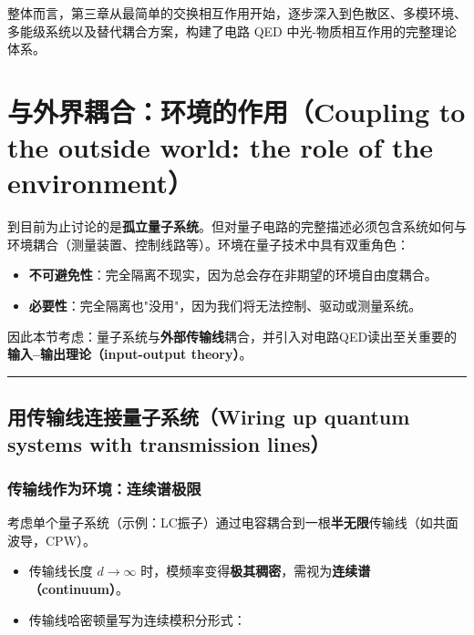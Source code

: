 \documentclass[12pt,a4paper,oneside]{ctexbook}
\begin{document}
整体而言，第三章从最简单的交换相互作用开始，逐步深入到色散区、多模环境、多能级系统以及替代耦合方案，构建了电路
QED 中光-物质相互作用的完整理论体系。


\section{与外界耦合：环境的作用（Coupling to the outside world: the role of the environment）}

到目前为止讨论的是\textbf{孤立量子系统}。但对量子电路的完整描述必须包含系统如何与环境耦合（测量装置、控制线路等）。环境在量子技术中具有双重角色：
\begin{itemize}
  \item \textbf{不可避免性}：完全隔离不现实，因为总会存在非期望的环境自由度耦合。
  \item \textbf{必要性}：完全隔离也"没用"，因为我们将无法控制、驱动或测量系统。
\end{itemize}

因此本节考虑：量子系统与\textbf{外部传输线}耦合，并引入对电路QED读出至关重要的\textbf{输入--输出理论（input-output theory）}。

\bigskip\hrule\bigskip

\subsection{用传输线连接量子系统（Wiring up quantum systems with transmission lines）}

\subsubsection{传输线作为环境：连续谱极限}

考虑单个量子系统（示例：LC振子）通过电容耦合到一根\textbf{半无限}传输线（如共面波导，CPW）。
\begin{itemize}
  \item 传输线长度 $d\to \infty$ 时，模频率变得\textbf{极其稠密}，需视为\textbf{连续谱（continuum）}。
  \item 传输线哈密顿量写为连续模积分形式：
\end{itemize}
\end{document}
